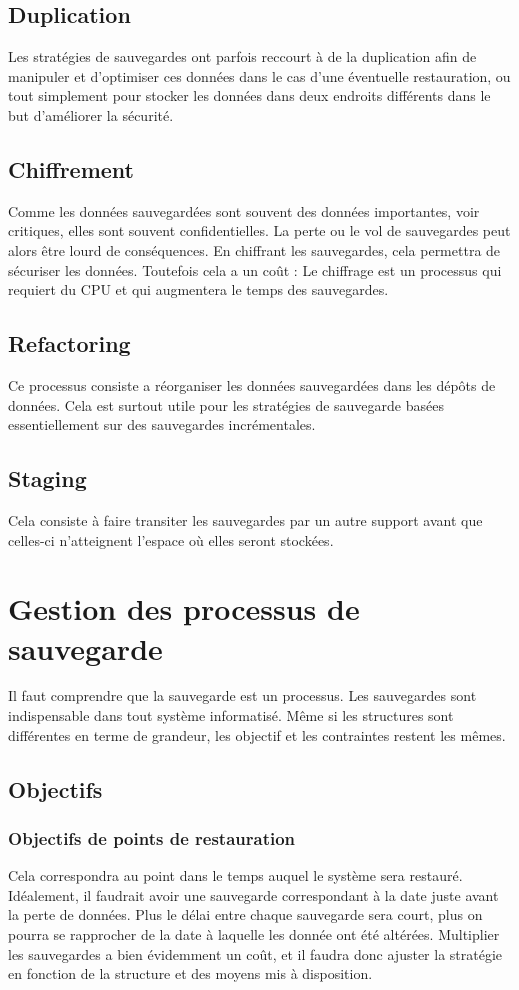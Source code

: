 \documentclass[a4paper,11pt]{report}
\begin{document}
\section{Duplication}
Les stratégies de sauvegardes ont parfois reccourt à de la duplication afin de manipuler et d'optimiser ces données dans le cas d'une éventuelle restauration, ou tout simplement pour stocker les données dans deux endroits différents dans le but d'améliorer la sécurité.

\section{Chiffrement}
Comme les données sauvegardées sont souvent des données importantes, voir critiques, elles sont souvent confidentielles.
La perte ou le vol de sauvegardes peut alors être lourd de conséquences.
En chiffrant les sauvegardes, cela permettra de sécuriser les données.
Toutefois cela a un coût : Le chiffrage est un processus qui requiert du CPU et qui augmentera le temps des sauvegardes.

\section{Refactoring}
Ce processus consiste a réorganiser les données sauvegardées dans les dépôts de données.
Cela est surtout utile pour les stratégies de sauvegarde basées essentiellement sur des sauvegardes incrémentales.

\section{Staging}
Cela consiste à faire transiter les sauvegardes par un autre support avant que celles-ci n'atteignent l'espace où elles seront stockées.

\chapter{Gestion des processus de sauvegarde}
Il faut comprendre que la sauvegarde est un processus. Les sauvegardes sont indispensable dans tout système informatisé.
Même si les structures sont différentes en terme de grandeur, les objectif et les contraintes restent les mêmes. 

\section{Objectifs}

\subsection{Objectifs de points de restauration}
Cela correspondra au point dans le temps auquel le système sera restauré.
Idéalement, il faudrait avoir une sauvegarde correspondant à la date juste avant la perte de données.
Plus le délai entre chaque sauvegarde sera court, plus on pourra se rapprocher de la date à laquelle les donnée ont été altérées.
Multiplier les sauvegardes a bien évidemment un coût, et il faudra donc ajuster la stratégie en fonction de la structure et des moyens mis à disposition.
\end{document}
